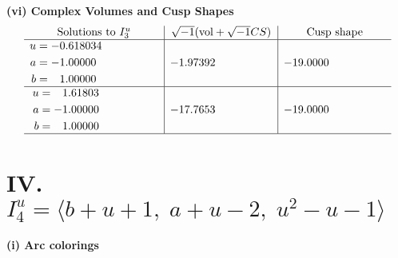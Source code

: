 \documentclass[1p]{elsarticle_modified}
\theoremstyle{definition}
\newcommand{\I}{\sqrt{-1}}
\begin{document}
\newpage\flushleft \textbf{(vi) Complex Volumes and Cusp Shapes}
$$\begin{array}{c|c|c}  
\text{Solutions to }I^u_{3}& \I (\text{vol} + \sqrt{-1}CS) & \text{Cusp shape}\\
 \hline 
\begin{aligned}
u &= -0.618034\phantom{ +0.000000I} \\
a &= -1.00000\phantom{ +0.000000I} \\
b &= \phantom{-}1.00000\phantom{ +0.000000I}\end{aligned}
 & -1.97392\phantom{ +0.000000I} & -19.0000\phantom{ +0.000000I} \\ \hline\begin{aligned}
u &= \phantom{-}1.61803\phantom{ +0.000000I} \\
a &= -1.00000\phantom{ +0.000000I} \\
b &= \phantom{-}1.00000\phantom{ +0.000000I}\end{aligned}
 & -17.7653\phantom{ +0.000000I} & -19.0000\phantom{ +0.000000I}\\
 \hline 
 \end{array}$$\newpage\newpage\renewcommand{\arraystretch}{1}
\centering \section*{IV. $I^u_{4}= \langle b+u+1,\;a+u-2,\;u^2- u-1 \rangle$}
\flushleft \textbf{(i) Arc colorings}\\
\end{document}

